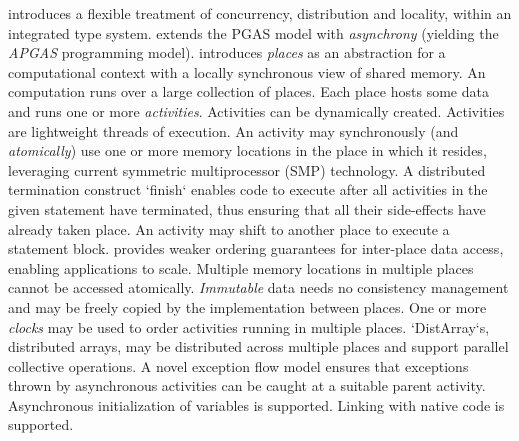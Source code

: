 {}\Xten{} introduces a flexible treatment of concurrency, distribution
and locality, within an integrated type system. \Xten{} extends the
PGAS model with {\em asynchrony} (yielding the {\em APGAS} programming
model). {}\Xten{} introduces {\em places} as an abstraction for a
computational context with a locally synchronous view of shared
memory. An \Xten{} computation runs over a large collection of places.
Each place hosts some data and runs one or more {\em
activities}. Activities can be dynamically created. Activities are lightweight threads of
execution. An activity may synchronously (and {\em atomically}) use
one or more memory locations in the place in which it resides,
leveraging current symmetric multiprocessor (SMP) technology.  A
distributed termination construct \xcd`finish` enables code to execute
after all activities in the given statement have terminated, thus
ensuring that all their side-effects have already taken place.
An activity may shift to another place to execute a statement block.
\Xten{} provides weaker ordering guarantees for
inter-place data access, enabling applications to scale.  
Multiple memory locations in multiple places cannot be
accessed atomically.  {\em Immutable} data needs no consistency
management and may be freely copied by the implementation between
places.  One or more {\em clocks} may be used to order activities
running in multiple 
places.  \xcd`DistArray`s, distributed arrays,  may be distributed across
multiple places and  support parallel collective operations. A novel
exception flow model ensures that exceptions thrown by asynchronous
activities can be caught at a suitable parent activity.  Asynchronous
initialization of variables is supported. Linking with native code is supported.
